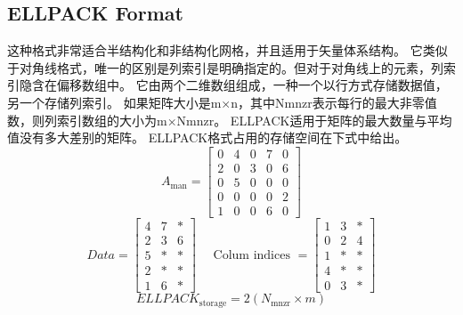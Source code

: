 \documentclass[forprint]{WHUBachelor}
\begin{document}
\subsection{ELLPACK Format}
这种格式非常适合半结构化和非结构化网格，并且适用于矢量体系结构\cite{Bell:SpMV:NVIDIA:2008}。 它类似于对角线格式，唯一的区别是列索引是明确指定的。但对于对角线上的元素，列索引隐含在偏移数组中。 它由两个二维数组组成，一种一个以行方式存储数据值，另一个存储列索引。 如果矩阵大小是m×n，其中Nmnzr表示每行的最大非零值数，则列索引数组的大小为m×Nmnzr。 ELLPACK适用于矩阵的最大数量与平均值没有多大差别的矩阵。 ELLPACK格式占用的存储空间在下式中给出。
\begin {equation} 
A_{\operatorname{man}}=\left[ \begin{array}{ccccc}{0} & {4} & {0} & {7} & {0} \\ {2} & {0} & {3} & {0} & {6} \\ {0} & {5} & {0} & {0} & {0} \\ {0} & {0} & {0} & {0} & {2} \\ {1} & {0} & {0} & {6} & {0}\end{array}\right]
 \end {equation}
\begin{equation} 
D a t a=\left[ \begin{array}{ccc}{4} & {7} & {*} \\ {2} & {3} & {6} \\ {5} & {*} & {*} \\ {2} & {*} & {*} \\ {1} & {6} & {*}\end{array}\right] \quad \text { Colum indices }=\left[ \begin{array}{ccc}{1} & {3} & {*} \\ {0} & {2} & {4} \\ {1} & {*} & {*} \\ {4} & {*} & {*} \\ {0} & {3} & {*}\end{array}\right]
 \end{equation}
\begin {equation} 
E L L P A C K_{\text {storage}}=2\left(N_{\text {mnzr}} \times m\right)
 \end {equation}
\end{document}
